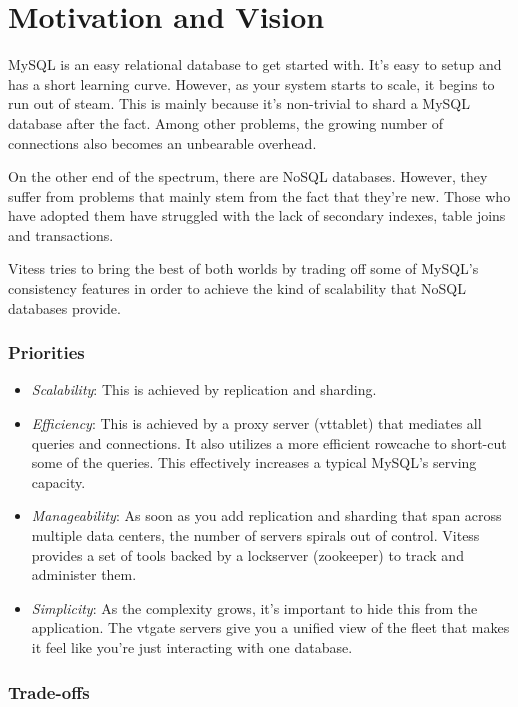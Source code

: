 \section{Motivation and Vision}\hypertarget{motivation-and-vision}{}\label{motivation-and-vision}

MySQL is an easy relational database to get started with.
It's easy to setup and has a short learning curve.
However, as your system starts to scale, it begins to run out of steam.
This is mainly because it's non-trivial to shard a MySQL database after the fact.
Among other problems, the growing number of connections also becomes an
unbearable overhead.

On the other end of the spectrum, there are NoSQL databases.
However, they suffer from problems that mainly stem from the fact that they're new.
Those who have adopted them have struggled with the lack of secondary indexes,
table joins and transactions.

Vitess tries to bring the best of both worlds by trading off
some of MySQL's consistency features in order to achieve the
kind of scalability that NoSQL databases provide.

\subsubsection{Priorities}\hypertarget{priorities}{}\label{priorities}

\begin{itemize}
\item \emph{Scalability}: This is achieved by replication and sharding.
\item \emph{Efficiency}: This is achieved by a proxy server (vttablet) that mediates
all queries and connections.
It also utilizes a more efficient rowcache to short-cut some of the queries.
This effectively increases a typical MySQL's serving capacity.
\item \emph{Manageability}: As soon as you add replication and sharding that span
across multiple data centers, the number of servers spirals out of control.
Vitess provides a set of tools backed by a lockserver (zookeeper) to
track and administer them.
\item \emph{Simplicity}: As the complexity grows, it's important to hide this
from the application.
The vtgate servers give you a unified view of the fleet that makes
it feel like you're just interacting with one database.
\end{itemize}

\subsubsection{Trade-offs}\hypertarget{trade-offs}{}\label{trade-offs}

